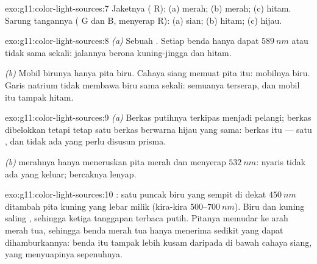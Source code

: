 \begin{solution}{exo:g11:color-light-sources:7}
Jaketnya ( R): (a) merah; (b) merah; (c) hitam. Sarung
tangannya ( G dan B, menyerap R): (a) sian; (b) hitam;
(c) hijau.
\end{solution}

\begin{solution}{exo:g11:color-light-sources:8}
\emph{(a)} Sebuah . Setiap benda hanya dapat
 $\qty{589}{nm}$ atau tidak sama sekali: jalannya berona
kuning-jingga dan hitam.

\emph{(b)} Mobil birunya hanya  pita biru. Cahaya siang
memuat pita itu: mobilnya biru. Garis natrium tidak membawa biru sama
sekali: semuanya terserap, dan mobil itu tampak hitam.
\end{solution}

\begin{solution}{exo:g11:color-light-sources:9}
\emph{(a)} Berkas putihnya terkipas menjadi pelangi; berkas 
dibelokkan tetapi tetap satu berkas berwarna hijau yang sama: berkas
itu  --- satu , dan tidak ada yang perlu
disusun prisma.

\emph{(b)}  merahnya hanya meneruskan pita merah dan menyerap
$\qty{532}{nm}$: nyaris tidak ada yang keluar; bercaknya lenyap.
\end{solution}

\begin{solution}{exo:g11:color-light-sources:10}
: satu puncak biru yang sempit di dekat $\qty{450}{nm}$
ditambah pita kuning yang lebar milik  (kira-kira
$500$--$\qty{700}{nm}$). Biru dan kuning saling , sehingga
ketiga tanggapan  terbaca putih. Pitanya memudar ke arah
merah tua, sehingga benda merah tua hanya menerima sedikit yang dapat
dihamburkannya: benda itu tampak lebih kusam daripada di bawah cahaya
siang, yang  menyuapinya sepenuhnya.
\end{solution}

